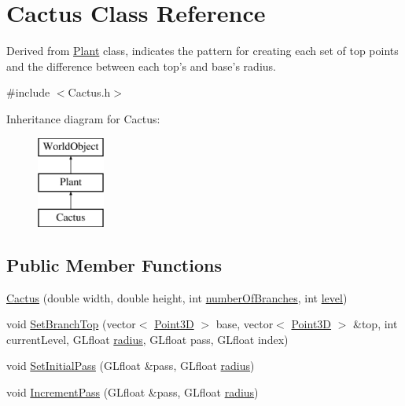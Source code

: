 \hypertarget{class_cactus}{\section{Cactus Class Reference}
\label{class_cactus}
}


Derived from \hyperlink{class_plant}{Plant} class, indicates the pattern for creating each set of top points and the difference between each top's and base's radius.  




{\ttfamily \#include $<$Cactus.\+h$>$}

Inheritance diagram for Cactus\+:\begin{figure}[H]
\begin{center}
\leavevmode
\includegraphics[height=3.000000cm]{class_cactus}
\end{center}
\end{figure}
\subsection*{Public Member Functions}
\begin{DoxyCompactItemize}
\item 
\hyperlink{class_cactus_a93bded0d899fc3b89e6be5f010d210e9}{Cactus} (double width, double height, int \hyperlink{class_plant_a4f86c46865d6211636140cef8805c6ee}{number\+Of\+Branches}, int \hyperlink{class_plant_ab49e92a2ab4ecdc762b5a1711fa3d65f}{level})
\item 
void \hyperlink{class_cactus_ae39a9e242e327a3f6c89126fb6d24a6b}{Set\+Branch\+Top} (vector$<$ \hyperlink{struct_point3_d}{Point3\+D} $>$ base, vector$<$ \hyperlink{struct_point3_d}{Point3\+D} $>$ \&top, int current\+Level, G\+Lfloat \hyperlink{class_plant_abef0f751fe6b1b43ed208966a70b4ab3}{radius}, G\+Lfloat pass, G\+Lfloat index)
\item 
void \hyperlink{class_cactus_a4a302b89f9c3ff94ac749bc870728c9e}{Set\+Initial\+Pass} (G\+Lfloat \&pass, G\+Lfloat \hyperlink{class_plant_abef0f751fe6b1b43ed208966a70b4ab3}{radius})
\item 
void \hyperlink{class_cactus_ae13abc19633a73f5647fb7da08b87faa}{Increment\+Pass} (G\+Lfloat \&pass, G\+Lfloat \hyperlink{class_plant_abef0f751fe6b1b43ed208966a70b4ab3}{radius})
\end{DoxyCompactItemize}
